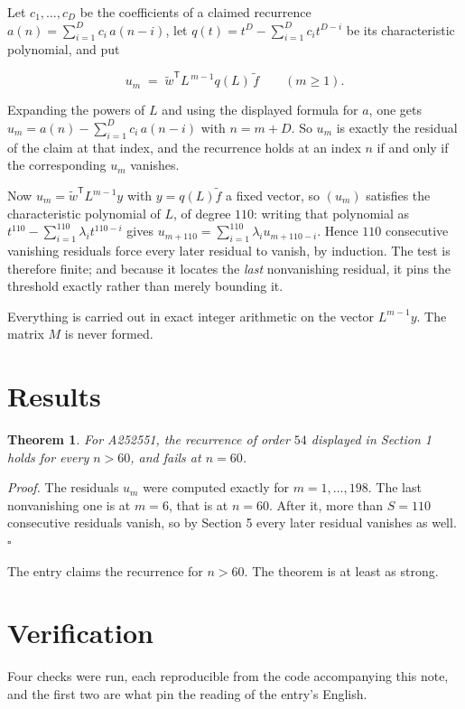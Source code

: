 \documentclass[11pt]{article}
\newtheorem{theorem}{Theorem}
\theoremstyle{definition}
\begin{document}
Let $c_1,\dots,c_D$ be the coefficients of a claimed recurrence $a(n) = \sum_{i=1}^{D} c_i\,a(n-i)$, let $q(t) = t^{D} - \sum_{i=1}^{D} c_i t^{D-i}$ be its characteristic polynomial, and put

\[u_m \;=\; \tilde w^{\mathsf T} L^{\,m-1} q(L)\,\tilde f \qquad (m \ge 1).\]

Expanding the powers of $L$ and using the displayed formula for $a$, one gets $u_m = a(n) - \sum_{i=1}^{D} c_i\,a(n-i)$ with $n = m + D$. So $u_m$ is exactly the residual of the claim at that index, and the recurrence holds at an index $n$ if and only if the corresponding $u_m$ vanishes.

Now $u_m = \tilde w^{\mathsf T} L^{m-1} y$ with $y = q(L)\tilde f$ a fixed vector, so $(u_m)$ satisfies the characteristic polynomial of $L$, of degree $110$: writing that polynomial as $t^{110} - \sum_{i=1}^{110} \lambda_i t^{110-i}$ gives $u_{m+110} = \sum_{i=1}^{110} \lambda_i u_{m+110-i}$. Hence $110$ consecutive vanishing residuals force every later residual to vanish, by induction. The test is therefore finite; and because it locates the {\itshape last} nonvanishing residual, it pins the threshold exactly rather than merely bounding it.

Everything is carried out in exact integer arithmetic on the vector $L^{m-1}y$. The matrix $M$ is never formed.

\section{Results}

\begin{theorem} For A252551, the recurrence of order $54$ displayed in Section 1 holds for every $n > 60$, and fails at $n = 60$.\end{theorem}

{\itshape Proof.} The residuals $u_m$ were computed exactly for $m = 1,\dots,198$. The last nonvanishing one is at $m = 6$, that is at $n = 60$. After it, more than $S = 110$ consecutive residuals vanish, so by Section 5 every later residual vanishes as well. $\square$

The entry claims the recurrence for $n > 60$. The theorem is at least as strong.

\section{Verification}

Four checks were run, each reproducible from the code accompanying this note, and the first two are what pin the reading of the entry's English.
\end{document}
